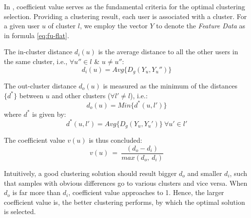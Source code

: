 In \sys{}, coefficient value serves as the fundamental criteria for the optimal clustering selection.
Providing a clustering result, each user is associated with a cluster.
For a given user $u$ of cluster $l$, we employ the vector $Y$ to denote the \textit{Feature Data} as in formula \ref{eq:fu-flat}.

\begin{definition}
\label{def:di}
The in-cluster distance $d_i(u)$ is the average distance to all the other users in the same cluster, i.e., $\forall u'' \in l$ \& $u \neq u''$:
\begin{equation}
	d_i(u) = Avg\{D_g(Y_u, Y_u'')\}
\end{equation}
\end{definition}

\begin{definition}
\label{def:do}
The out-cluster distance $d_o(u)$ is measured as the minimum of the distances $\{d^{\ast}\}$ between $u$ and other clusters ($\forall l' \neq l$), i.e.:
\begin{equation}
	d_o(u) = Min\{d^{\ast}(u, l')\}
\end{equation}
where $d^{\ast}$ is given by:
\begin{equation}
	d^{\ast}(u, l') = Avg\{D_g(Y_u, Y_u')\}\ \forall u' \in l'
\end{equation}
\end{definition}

\begin{definition}
\label{def:coef}
The coefficient value $v(u)$ is thus concluded:
\begin{equation}
\label{eq:coef}
v(u)\ =\ \frac{(d_o - d_i)}{max(d_o,\ d_i)}	
\end{equation}
\end{definition}

Intuitively, a good clustering solution should result bigger $d_o$ and smaller $d_i$, such that samples with obvious differences go to various clusters and vice versa.
When $d_o$ is far more than $d_i$, coefficient value approaches to 1.
Hence, the larger coefficient value is, the better clustering performs, by which the optimal solution is selected.





